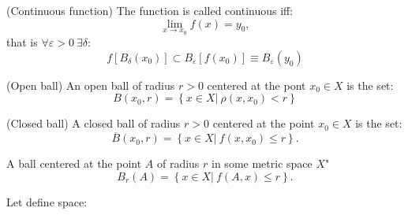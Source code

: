 \begin{definition}{(Continuous function)}{}
    The function is called continuous iff:
    \[
        \lim\limits_{x\to x_0} f(x) = y_0,
    \]
    that is $\forall \varepsilon > 0 \ \exists \delta:$
    \[
        f\left[B_{\delta}(x_0)\right] \subset B_\varepsilon\left[f(x_0)\right] \equiv B_\varepsilon(y_0)
    \]
\end{definition}

\begin{definition}{(Open ball)}{}
    An open ball of radius $r > 0$ centered at the pont $x_0 \in X$ is the set:
    \[
        B(x_0, r) = \left\{x \in X| \ \rho(x,x_0) < r\right\}  
    \]
\end{definition}

\begin{definition}{(Closed ball)}{}
    A closed ball of radius $r> 0$ centered at the point $x_0 \in X$ is the set:
    \[
        \overline{B}(x_0, r) = \left\{x \in X| \ f(x, x_0) \leq r\right\}.  
    \]
\end{definition}

\begin{note}{}{}
    A ball centered at the point $A$ of radius $r$ in some metric space $X$"
    \[
        B_r(A) = \left\{x \in X| \ f(A, x) \leq r\right\}. 
    \]
\end{note}
\Ex Let define space:

